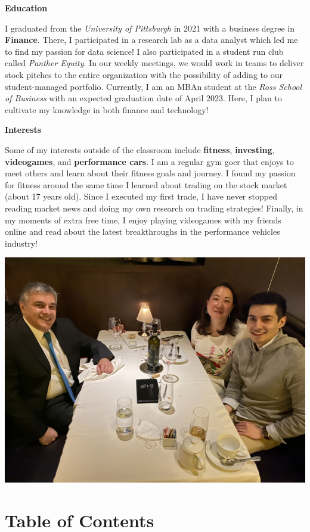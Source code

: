 \documentclass[
]{book}
\begin{document}
\textbf{Education}

I graduated from the \emph{University of Pittsburgh} in 2021 with a business degree in \textbf{Finance}. There, I participated in a research lab as a data analyst which led me to find my passion for data science! I also participated in a student run club called \emph{Panther Equity}. In our weekly meetings, we would work in teams to deliver stock pitches to the entire organization with the possibility of adding to our student-managed portfolio. Currently, I am an MBAn student at the \emph{Ross School of Business} with an expected graduation date of April 2023. Here, I plan to cultivate my knowledge in both finance and technology!

\textbf{Interests}

Some of my interests outside of the classroom include \textbf{fitness}, \textbf{investing}, \textbf{videogames}, and \textbf{performance cars}. I am a regular gym goer that enjoys to meet others and learn about their fitness goals and journey. I found my passion for fitness around the same time I learned about trading on the stock market (about 17 years old). Since I executed my first trade, I have never stopped reading market news and doing my own research on trading strategies! Finally, in my moments of extra free time, I enjoy playing videogames with my friends online and read about the latest breakthroughs in the performance vehicles industry!

\includegraphics{About_Me_Photo.jpeg}

\hypertarget{table-of-contents}{%
\chapter*{Table of Contents}\label{table-of-contents}}
\end{document}
